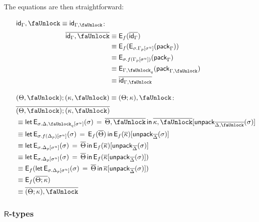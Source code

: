 \documentclass[10pt]{article}
\theoremstyle{definition}
\newcommand{\id}{\mathsf{id}}
\newcommand\EEs[4]{\ensuremath{\mathsf{let} \, \mathsf{E}_{#1}(#3) \, = \, {#2} \, \mathsf{in} \, #4}}
\newcommand\EIs[2]{\ensuremath{\mathsf{E}_{#1}{(#2)}}}
\newcommand\pack[1]{\ensuremath{\mathsf{pack}_{#1}}}
\newcommand\unpack[2]{\ensuremath{\mathsf{unpack}_{#1}(#2)}}
\newcommand\unp[2]{\ensuremath{{#2}^u}}
\newcommand{\modeof}[1]{{#1}_p}
\newcommand{\modeofq}[1]{{#1}_q}
\newcommand{\upstairs}[1]{\overline{#1}}
\newcommand{\lock}{\text{\faUnlock}}
\begin{document}
The equations are then straightforward:
\begin{enumerate}[style = multiline, labelwidth = 80pt]
\item[{$\id_\Gamma , \lock \equiv \id_{\Gamma, \lock}$}:]
\begin{align*}
\upstairs{\id_\Gamma , \lock}
&\equiv \EIs{f}{\upstairs{\id_\Gamma}} \\
&\equiv \EIs{f}{\EIs{\sigma.\modeof{\Gamma}[\unp{\Gamma}{\sigma}]}{\pack{\Gamma}}} \\
&\equiv \EIs{\sigma. f(\modeof{\Gamma}[\unp{\Gamma}{\sigma}])}{\pack{\Gamma}} \\
&\equiv \EIs{\modeofq{\Gamma, \lock}}{\pack{\Gamma, \lock}} \\
&\equiv \upstairs{\id_{\Gamma, \lock}}
\end{align*}

\item[{$(\Theta, \lock) ; (\kappa, \lock) \equiv (\Theta ; \kappa), \lock$}:] 
\begin{align*}
&\upstairs{(\Theta, \lock) ; (\kappa, \lock)} \\
&\equiv \EEs{\sigma.\modeofq{\Delta, \lock}[\unp{\Delta, \lock}{\sigma}]}{\upstairs{\Theta, \lock}}{\sigma}{\upstairs{\kappa, \lock}[\unpack{\upstairs{\Delta, \lock}}{\sigma}]} \\
&\equiv \EEs{\sigma.f(\modeof{\Delta})[\unp{\Delta}{\sigma}]}{\EIs{f}{\upstairs{\Theta}}}{\sigma}{\EIs{f}{\upstairs{\kappa}}[\unpack{\upstairs{\Delta}}{\sigma}]} \\
&\equiv \EEs{\sigma.\modeof{\Delta}[\unp{\Delta}{\sigma}]}{\upstairs{\Theta}}{\sigma}{\EIs{f}{\upstairs{\kappa}}[\unpack{\upstairs{\Delta}}{\sigma}]} \\
&\equiv \EEs{\sigma.\modeof{\Delta}[\unp{\Delta}{\sigma}]}{\upstairs{\Theta}}{\sigma}{\EIs{f}{\upstairs{\kappa}[\unpack{\upstairs{\Delta}}{\sigma}]}} \\
&\equiv \EIs{f}{\EEs{\sigma.\modeof{\Delta}[\unp{\Delta}{\sigma}]}{\upstairs{\Theta}}{\sigma}{\upstairs{\kappa}[\unpack{\upstairs{\Delta}}{\sigma}]}} \\
&\equiv \EIs{f}{\upstairs{\Theta ; \kappa}} \\
&\equiv \upstairs{(\Theta ; \kappa), \lock}
\end{align*}
\end{enumerate}

\subsubsection{$\mathsf{R}$-types}
\end{document}
